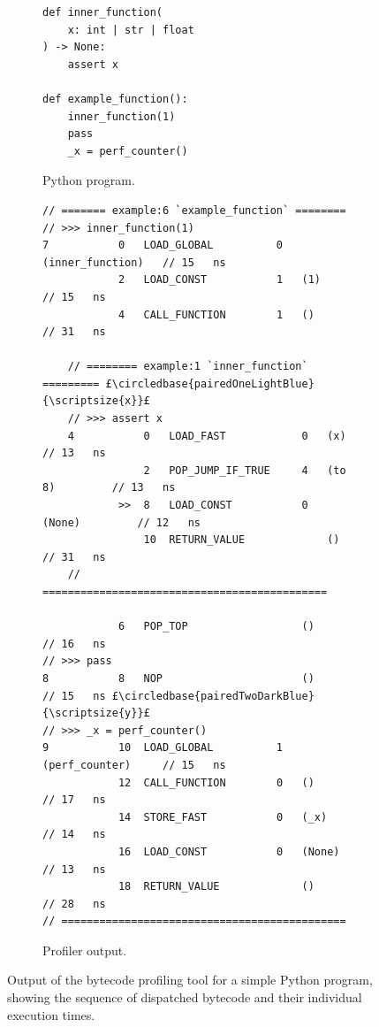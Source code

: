 \begin{figure}[H]
    \centering
    \begin{subfigure}[b]{0.275\textwidth}
       \centering
        \begin{verbatim}
def inner_function(
    x: int | str | float
) -> None:
    assert x

def example_function():
    inner_function(1)
    pass
    _x = perf_counter()
        \end{verbatim}
        \footnotesize\vspace{8em}
        \caption{Python program.}
        \label{listing:profiler-example-python}
    \end{subfigure}
    \hfill
    \begin{subfigure}[b]{0.695\textwidth}
        \centering
        \begin{verbatim}
// ======= example:6 `example_function` ========
// >>> inner_function(1)
7           0   LOAD_GLOBAL          0   (inner_function)   // 15   ns
            2   LOAD_CONST           1   (1)                // 15   ns
            4   CALL_FUNCTION        1   ()                 // 31   ns

    // ======== example:1 `inner_function` ========= £\circledbase{pairedOneLightBlue}{\scriptsize{x}}£
    // >>> assert x
    4           0   LOAD_FAST            0   (x)            // 13   ns
                2   POP_JUMP_IF_TRUE     4   (to 8)         // 13   ns
            >>  8   LOAD_CONST           0   (None)         // 12   ns
                10  RETURN_VALUE             ()             // 31   ns
    // =============================================

            6   POP_TOP                  ()                 // 16   ns
// >>> pass
8           8   NOP                      ()                 // 15   ns £\circledbase{pairedTwoDarkBlue}{\scriptsize{y}}£
// >>> _x = perf_counter()
9           10  LOAD_GLOBAL          1   (perf_counter)     // 15   ns
            12  CALL_FUNCTION        0   ()                 // 17   ns
            14  STORE_FAST           0   (_x)               // 14   ns
            16  LOAD_CONST           0   (None)             // 13   ns
            18  RETURN_VALUE             ()                 // 28   ns
// =============================================
        \end{verbatim}
        \caption{Profiler output.}
        \label{listing:profiler-example-bytecode}
    \end{subfigure}
    \vspace{1em}
    \captionsetup{name=Listing}
    \caption{Output of the bytecode profiling tool for a simple Python program, showing the sequence of dispatched bytecode and their individual execution times.}
    \label{listing:profiler-example}
\end{figure}


